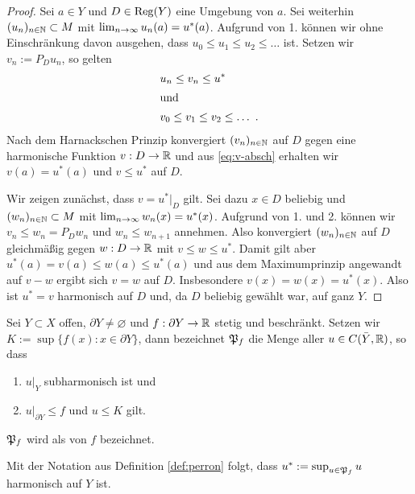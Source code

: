 \begin{proof}
  Sei $a \in Y$ und $D \in \operatorname{Reg}(Y)$ eine Umgebung von $a$. Sei
  weiterhin $(u_n)_{n \in \mathbb{N}} \subset M$ mit $\lim_{n \rightarrow \infty}
  u_n(a) = u^\ast(a)$. Aufgrund von 1. können wir ohne Einschränkung davon ausgehen, dass
  $u_0 \leq u_1 \leq u_2 \leq \dots$ ist. Setzen wir $v_n := P_D u_n$, so gelten
  \begin{align}
    & u_n \leq v_n \leq u^\ast \label{eq:v-absch} \\
    \intertext{und}
   & v_0 \leq v_1 \leq v_2 \leq \dots \ . \nonumber
  \end{align}
  Nach dem Harnackschen Prinzip konvergiert $(v_n)_{n \in \mathbb{N}}$ auf $D$
  gegen eine harmonische Funktion $v: D \rightarrow \mathbb{R}$ und aus
  \eqref{eq:v-absch} erhalten wir $v(a) = u^\ast(a)$ und $v \leq
  u^\ast$ auf $D$.
  
  Wir zeigen zunächst, dass $v = u^\ast|_D$ gilt. Sei dazu $x \in
  D$ beliebig und $(w_n)_{n\in \mathbb{N}}\subset M$ mit
  $\lim_{n \rightarrow \infty}w_n(x) = u^\ast(x)$. Aufgrund von 1. und
  2. können wir $v_n \leq w_n = P_D w_n$ und $w_n
  \leq w_{n+1}$ annehmen. Also konvergiert $(w_n)_{n \in \mathbb{N}}$ auf $D$
  gleichmäßig gegen $w: D \rightarrow \mathbb{R}$ mit $v \leq w \leq u^\ast$. Damit
  gilt aber $u^\ast(a) = v(a) \leq w(a) \leq u^\ast(a)$ und aus
  dem Maximumprinzip angewandt auf $v-w$ ergibt sich $v = w$ auf
  $D$. Insbesondere $v(x) = w(x) = u^\ast(x)$. Also ist $u^\ast = v$
  harmonisch auf $D$ und, da $D$ beliebig gewählt
  war, auf ganz $Y$.
\end{proof}

\begin{defin}
  \label{def:perron}
  Sei $Y \subset X$ offen, $\partial Y \neq \varnothing$ und
  $f: \partial Y \rightarrow \mathbb{R}$ stetig und beschränkt. Setzen wir $K :=
  \sup\{f(x) : x \in \partial Y\}$, dann bezeichnet
  $\mathfrak{P}_f$ die Menge aller $u \in C(\bar Y, \mathbb{R})$, so dass
  \begin{enumerate}
  \item $u|_Y$ subharmonisch ist und
  \item $u|_{\partial Y} \leq f$ und $u \leq K$ gilt.
  \end{enumerate}
  $\mathfrak{P}_f$ wird als  von $f$ bezeichnet.
\end{defin}

\begin{cor}
  Mit der Notation aus Definition \ref{def:perron} folgt, dass $u^\ast := \sup_{u
    \in \mathfrak{P}_f} u$ harmonisch auf $Y$ ist.
\end{cor}

